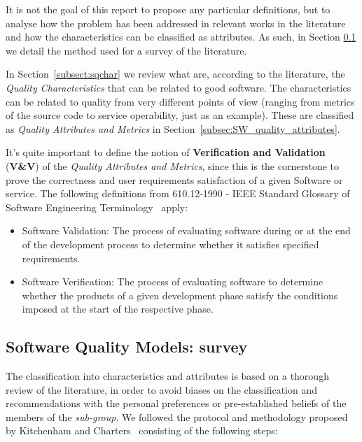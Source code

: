 \documentclass[a4paper]{article}
\begin{document}
It is not the goal of this report to propose any particular definitions, but to analyse how the problem has been addressed in relevant works in the literature and how the characteristics can be classified as attributes. As such, in Section \ref{subsec:sqm_survey} we detail the method used for a survey of the literature.

In Section~\ref{subsect:sqchar} we review what are, according to the literature, the \textit{Quality Characteristics} that can be related to good software. The characteristics can be related to quality from very different points of view (ranging from metrics of the source code to service operability, just as an example). These are classified as \textit{Quality Attributes and Metrics} in Section~\ref{subsec:SW_quality_attributes}.

It's quite important to define the notion of \textbf{Verification and Validation} (\textbf{V\&V}) of the \textit{Quality Attributes and Metrics}, since this is the cornerstone to prove the correctness and user requirements satisfaction of a given Software or service. The following definitions from 610.12-1990 - IEEE Standard Glossary of Software Engineering Terminology~\cite{ieee610} apply:

\begin{itemize}
    \item Software Validation: The process of evaluating software during or at the end of the development process to determine whether it satisfies specified requirements.
    \item Software Verification: The process of evaluating software to determine whether the products of a given development phase satisfy the conditions imposed at the start of the respective phase.
\end{itemize}

\subsection{Software Quality Models: survey}
\label{subsec:sqm_survey}

The classification into characteristics and attributes is based on a thorough review of the literature, in order to avoid biases on the classification and recommendations with the personal preferences or pre-established beliefs of the members of the \textit{sub-group}. We followed the protocol and methodology proposed by Kitchenham and Charters~\cite{keele2007guidelines} consisting of the following steps:
\end{document}
